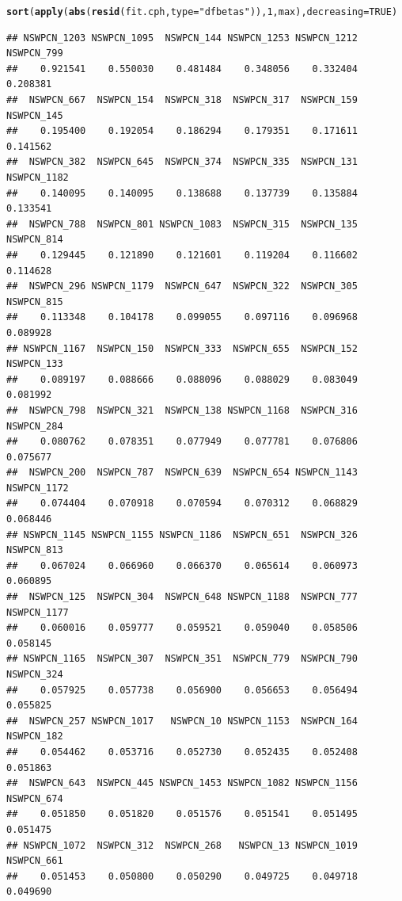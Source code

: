 \documentclass{article}\usepackage[]{graphicx}\usepackage[]{color}
\makeatletter
\newcommand{\hlnum}[1]{\textcolor[rgb]{0.686,0.059,0.569}{#1}}%
\newcommand{\hlstr}[1]{\textcolor[rgb]{0.192,0.494,0.8}{#1}}%
\newcommand{\hlstd}[1]{\textcolor[rgb]{0.345,0.345,0.345}{#1}}%
\newcommand{\hlkwc}[1]{\textcolor[rgb]{0.333,0.667,0.333}{#1}}%
\newcommand{\hlkwd}[1]{\textcolor[rgb]{0.737,0.353,0.396}{\textbf{#1}}}%
\newenvironment{kframe}{%
 \def\at@end@of@kframe{}%
 \ifinner\ifhmode%
  \def\at@end@of@kframe{\end{minipage}}%
  \begin{minipage}{\columnwidth}%
 \fi\fi%
 \def\FrameCommand##1{\hskip\@totalleftmargin \hskip-\fboxsep
 \colorbox{shadecolor}{##1}\hskip-\fboxsep
     \hskip-\linewidth \hskip-\@totalleftmargin \hskip\columnwidth}%
 \MakeFramed {\advance\hsize-\width
   \@totalleftmargin\z@ \linewidth\hsize
   \@setminipage}}%
 {\par\unskip\endMakeFramed%
 \at@end@of@kframe}
\newenvironment{knitrout}{}{} %
\makeatother
\begin{document}
\begin{knitrout}
{}


\begin{kframe}\begin{alltt}
\hlkwd{sort}\hlstd{(}\hlkwd{apply}\hlstd{(}\hlkwd{abs}\hlstd{(}\hlkwd{resid}\hlstd{(fit.cph,} \hlkwc{type} \hlstd{=} \hlstr{"dfbetas"}\hlstd{)),} \hlnum{1}\hlstd{, max),} \hlkwc{decreasing} \hlstd{=} \hlnum{TRUE}\hlstd{)}
\end{alltt}
\begin{verbatim}
## NSWPCN_1203 NSWPCN_1095  NSWPCN_144 NSWPCN_1253 NSWPCN_1212  NSWPCN_799 
##    0.921541    0.550030    0.481484    0.348056    0.332404    0.208381 
##  NSWPCN_667  NSWPCN_154  NSWPCN_318  NSWPCN_317  NSWPCN_159  NSWPCN_145 
##    0.195400    0.192054    0.186294    0.179351    0.171611    0.141562 
##  NSWPCN_382  NSWPCN_645  NSWPCN_374  NSWPCN_335  NSWPCN_131 NSWPCN_1182 
##    0.140095    0.140095    0.138688    0.137739    0.135884    0.133541 
##  NSWPCN_788  NSWPCN_801 NSWPCN_1083  NSWPCN_315  NSWPCN_135  NSWPCN_814 
##    0.129445    0.121890    0.121601    0.119204    0.116602    0.114628 
##  NSWPCN_296 NSWPCN_1179  NSWPCN_647  NSWPCN_322  NSWPCN_305  NSWPCN_815 
##    0.113348    0.104178    0.099055    0.097116    0.096968    0.089928 
## NSWPCN_1167  NSWPCN_150  NSWPCN_333  NSWPCN_655  NSWPCN_152  NSWPCN_133 
##    0.089197    0.088666    0.088096    0.088029    0.083049    0.081992 
##  NSWPCN_798  NSWPCN_321  NSWPCN_138 NSWPCN_1168  NSWPCN_316  NSWPCN_284 
##    0.080762    0.078351    0.077949    0.077781    0.076806    0.075677 
##  NSWPCN_200  NSWPCN_787  NSWPCN_639  NSWPCN_654 NSWPCN_1143 NSWPCN_1172 
##    0.074404    0.070918    0.070594    0.070312    0.068829    0.068446 
## NSWPCN_1145 NSWPCN_1155 NSWPCN_1186  NSWPCN_651  NSWPCN_326  NSWPCN_813 
##    0.067024    0.066960    0.066370    0.065614    0.060973    0.060895 
##  NSWPCN_125  NSWPCN_304  NSWPCN_648 NSWPCN_1188  NSWPCN_777 NSWPCN_1177 
##    0.060016    0.059777    0.059521    0.059040    0.058506    0.058145 
## NSWPCN_1165  NSWPCN_307  NSWPCN_351  NSWPCN_779  NSWPCN_790  NSWPCN_324 
##    0.057925    0.057738    0.056900    0.056653    0.056494    0.055825 
##  NSWPCN_257 NSWPCN_1017   NSWPCN_10 NSWPCN_1153  NSWPCN_164  NSWPCN_182 
##    0.054462    0.053716    0.052730    0.052435    0.052408    0.051863 
##  NSWPCN_643  NSWPCN_445 NSWPCN_1453 NSWPCN_1082 NSWPCN_1156  NSWPCN_674 
##    0.051850    0.051820    0.051576    0.051541    0.051495    0.051475 
## NSWPCN_1072  NSWPCN_312  NSWPCN_268   NSWPCN_13 NSWPCN_1019  NSWPCN_661 
##    0.051453    0.050800    0.050290    0.049725    0.049718    0.049690 

\end{verbatim}
\end{kframe}
\end{knitrout}
\end{document}
